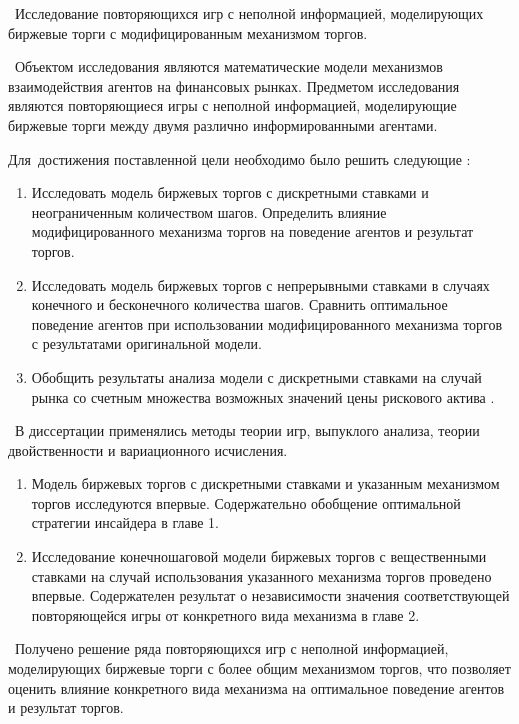 \aim\ Исследование повторяющихся игр с неполной информацией, моделирующих
биржевые торги с модифицированным механизмом торгов.

\researchsubject\ Объектом исследования являются математические модели
механизмов взаимодействия агентов на финансовых рынках. Предметом исследования
являются повторяющиеся игры с неполной информацией, моделирующие биржевые торги
между двумя различно информированными агентами.

Для~достижения поставленной цели необходимо было решить следующие {\tasks}:
\begin{enumerate}
\item Исследовать модель биржевых торгов с дискретными ставками и неограниченным
  количеством шагов. Определить влияние модифицированного механизма торгов на
  поведение агентов и результат торгов.
\item Исследовать модель биржевых торгов с непрерывными ставками в случаях
  конечного и бесконечного количества шагов. Сравнить оптимальное поведение
  агентов при использовании модифицированного механизма торгов с результатами
  оригинальной модели.
\item Обобщить результаты анализа модели с дискретными ставками на случай рынка
  со счетным множества возможных значений цены рискового актива .
\end{enumerate}

\methods\ В диссертации применялись методы теории игр, выпуклого анализа, теории
двойственности и вариационного исчисления.

\novelty
\begin{enumerate}
\item Модель биржевых торгов с дискретными ставками и указанным механизмом
  торгов исследуются впервые. Содержательно обобщение оптимальной стратегии
  инсайдера в главе 1.
\item Исследование конечношаговой модели биржевых торгов с вещественными
  ставками на случай использования указанного механизма торгов проведено
  впервые. Содержателен результат о независимости значения соответствующей
  повторяющейся игры от конкретного вида механизма в главе 2.
\end{enumerate}

\influence\ Получено решение ряда повторяющихся игр с неполной информацией,
моделирующих биржевые торги с более общим механизмом торгов, что позволяет
оценить влияние конкретного вида механизма на оптимальное поведение агентов и
результат торгов.

